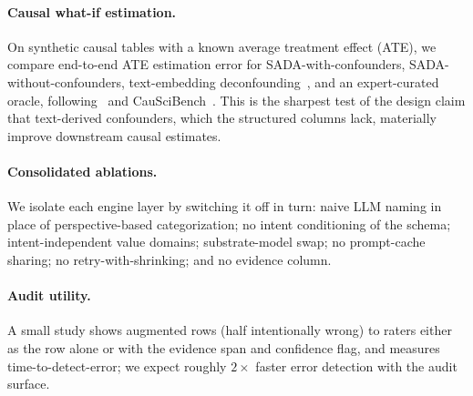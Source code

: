 \paragraph{Causal what-if estimation.}
\label{subsec:rq4}
On synthetic causal tables with a known average treatment effect (ATE), we compare end-to-end ATE estimation error for SADA-with-confounders, SADA-without-confounders, text-embedding deconfounding~\citep{deconfound2026reading}, and an expert-curated oracle, following~\citep{causalhybrid2025} and CauSciBench~\citep{causcibench2025}. This is the sharpest test of the design claim that text-derived confounders, which the structured columns lack, materially improve downstream causal estimates.

\paragraph{Consolidated ablations.}
\label{subsec:ablations}
We isolate each engine layer by switching it off in turn: naive LLM naming in place of perspective-based categorization; no intent conditioning of the schema; intent-independent value domains; substrate-model swap; no prompt-cache sharing; no retry-with-shrinking; and no evidence column.

\paragraph{Audit utility.}
\label{subsec:audit-eval}
A small study shows augmented rows (half intentionally wrong) to raters either as the row alone or with the evidence span and confidence flag, and measures time-to-detect-error; we expect roughly $2\times$ faster error detection with the audit surface.
\fi  %
